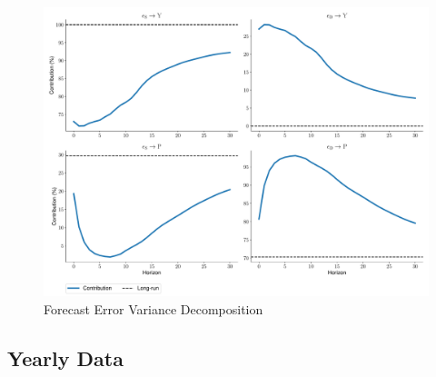 \documentclass[a4paper,12pt]{article}
\begin{document}
\blindtext

\begin{figure}[H]
    \centering
\caption{Forecast Error Variance Decomposition}
    \includegraphics[width=\textwidth]{../output/figures/FEVD.pdf} 
\end{figure}
\pagebreak

\begin{appendices}
\section{Yearly Data}

\begin{table}[h]
\centering

\end{table}

\end{appendices}

\pagebreak



\end{document}
